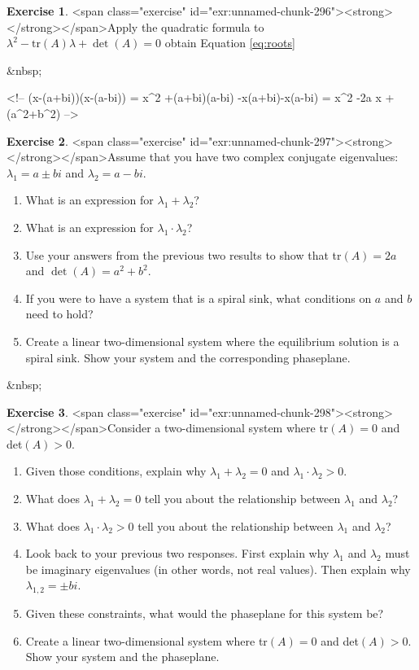 \documentclass[
]{book}
\theoremstyle{definition}
\theoremstyle{definition}
\theoremstyle{definition}
\newtheorem{exercise}{Exercise}[chapter]
\theoremstyle{remark}
\begin{document}
\begin{exercise}
<span class="exercise" id="exr:unnamed-chunk-296"><strong>\label{exr:unnamed-chunk-296} </strong></span>Apply the quadratic formula to $\lambda^{2} - \mbox{tr}(A)\lambda + \det(A)=0$ obtain Equation \ref{eq:roots}
\end{exercise}

&nbsp;

<!-- (x-(a+bi))(x-(a-bi)) = x^2 +(a+bi)(a-bi) -x(a+bi)-x(a-bi) = x^2 -2a x + (a^2+b^2)  -->
\begin{exercise}
<span class="exercise" id="exr:unnamed-chunk-297"><strong>\label{exr:unnamed-chunk-297} </strong></span>Assume that you have two complex conjugate eigenvalues: $\lambda_{1} = a \pm bi$ and $\lambda_{2} = a - bi$.

\begin{enumerate}[label=\alph*.]
\item What is an expression for $\lambda_{1} + \lambda_{2}$?
\item What is an expression for $\lambda_{1} \cdot \lambda_{2}$?
\item Use your answers from the previous two results to show that tr$(A)=2a$ and $\det(A)=a^{2}+b^{2}$.
\item If you were to have a system that is a spiral sink, what conditions on $a$ and $b$ need to hold?
\item Create a linear two-dimensional system where the equilibrium solution is a spiral sink.  Show your system and the corresponding phaseplane. 
\end{enumerate}
\end{exercise}


&nbsp;
\begin{exercise}
<span class="exercise" id="exr:unnamed-chunk-298"><strong>\label{exr:unnamed-chunk-298} </strong></span>Consider a two-dimensional system where tr$(A)=0$ and det$(A)>0$.

\begin{enumerate}[label=\alph*.]
\item Given those conditions, explain why $\lambda_{1} + \lambda_{2}=0$ and $\lambda_{1} \cdot \lambda_{2}>0$.
\item What does $\lambda_{1} + \lambda_{2}=0$ tell you about the relationship between $\lambda_{1}$ and $\lambda_{2}$?
\item What does $\lambda_{1} \cdot \lambda_{2}>0$ tell you about the relationship between $\lambda_{1}$ and $\lambda_{2}$?
\item Look back to your previous two responses. First explain why $\lambda_{1}$ and $\lambda_{2}$ must be imaginary eigenvalues (in other words, not real values).  Then explain why $\lambda_{1,2}= \pm bi$.
\item Given these constraints, what would the phaseplane for this system be?
\item Create a linear two-dimensional system where tr$(A)=0$ and det$(A)>0$.  Show your system and the phaseplane. 
\end{enumerate}
\end{exercise}
\end{document}

